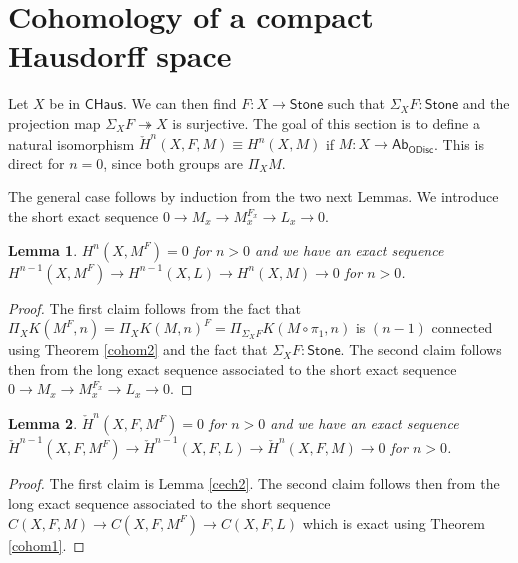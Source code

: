 \documentclass[10pt,a4paper]{article}
\newtheorem{lemma}{Lemma}[section]
\newcommand{\ras}{\twoheadrightarrow}
\newcommand{\Stone}{\mathsf{Stone}}
\newcommand{\CHaus}{\mathsf{CHaus}}
\newcommand{\OAbG}{\mathsf{Ab_{ODisc}}}
\newcommand{\ra}{\rightarrow}
\newcommand\cHH{\check{H}}%
\begin{document}
\section{Cohomology of a compact Hausdorff space}

Let $X$ be in $\CHaus$. We can then find $F:X\rightarrow\Stone$ such that $\Sigma_XF:\Stone$
and the projection map $\Sigma_XF\ras X$ is surjective. The goal of this section is to define
a natural isomorphism $\cHH^n(X,F,M) \equiv H^n(X,M)$ if $M:X\ra \OAbG$. This is direct for $n = 0$, since both
groups are $\Pi_XM$. 

The general case follows by induction from the two next Lemmas.
We introduce the short exact sequence $0\ra M_x\ra M_x^{F_x}\ra L_x\ra 0$.

\begin{lemma}
 $H^n(X,M^F) = 0$ for $n>0$ and we have an exact sequence $H^{n-1}(X,M^F)\ra H^{n-1}(X,L)\ra H^n(X,M)\ra 0$ for $n>0$.
\end{lemma}

\begin{proof}
  The first claim follows from the fact that $\Pi_XK(M^F,n) = \Pi_XK(M,n)^F = \Pi_{\Sigma_XF}K(M\circ\pi_1,n)$
  is $(n-1)$ connected using Theorem \ref{cohom2} and the fact that $\Sigma_XF:\Stone$. The second claim
  follows then from the long exact sequence associated to the short exact sequence
  $0\ra M_x\ra M_x^{F_x}\ra L_x\ra 0$.
\end{proof}


\begin{lemma}
  $\cHH^n(X,F,M^F) = 0$ for $n>0$ and we have an exact sequence
  $\cHH^{n-1}(X,F,M^F)\ra\cHH^{n-1}(X,F,L)\ra \cHH^n(X,F,M)\ra 0$ for $n>0$.
\end{lemma}

\begin{proof}
  The first claim is Lemma \ref{cech2}. The second claim follows then from the long
  exact sequence associated to the short sequence $C(X,F,M) \ra C(X,F,M^F)\ra C(X,F,L)$ which
  is exact using Theorem \ref{cohom1}.
\end{proof}
\end{document}
